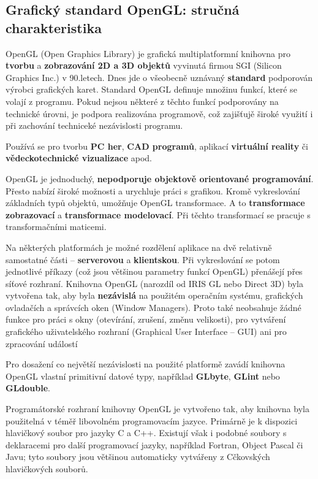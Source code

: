 \subsection{Grafický standard OpenGL: stručná charakteristika}
OpenGL (Open Graphics Library) je grafická multiplatformní knihovna pro \textbf{tvorbu} a \textbf{zobrazování 2D a 3D objektů} vyvinutá firmou SGI (Silicon Graphics Inc.) v 90.letech. Dnes jde o všeobecně uznávaný \textbf{standard} podporován výrobci grafických karet. Standard OpenGL definuje množinu funkcí, které se volají z programu. Pokud nejsou některé z těchto funkcí podporovány na technické úrovni, je podpora realizována programově, což zajišťujě široké využití i při zachování techniceké nezávislosti programu. 

Používá se pro tvorbu \textbf{PC her}, \textbf{CAD programů}, aplikací \textbf{virtuální reality} či \textbf{vědeckotechnické vizualizace} apod. 

OpenGL je jednoduchý, \textbf{nepodporuje objektově orientované programování}. Přesto nabízí široké možnosti a urychluje práci s grafikou. Kromě vykreslování základních typů objektů, umožňuje OpenGL transformace. A to \textbf{transformace zobrazovací} a \textbf{transformace modelovací}. Při těchto transformací se pracuje s transformačními maticemi.

Na některých platformách je možné rozdělení aplikace na dvě relativně samostatné části – \textbf{serverovou} a \textbf{klientskou}. Při vykreslování se potom jednotlivé příkazy (což jsou většinou parametry funkcí OpenGL) přenášejí přes síťové rozhraní. Knihovna OpenGL (narozdíl od IRIS GL nebo Direct 3D) byla vytvořena tak, aby byla \textbf{nezávislá} na použitém operačním systému, grafických ovladačích a správcích oken (Window Managers). Proto také neobsahuje žádné funkce pro práci s okny (otevírání, zrušení, změnu velikosti), pro vytváření grafického uživatelského rozhraní (Graphical User Interface – GUI) ani pro zpracování událostí

Pro dosažení co největší nezávislosti na použité platformě zavádí knihovna OpenGL vlastní primitivní datové typy, například \textbf{GLbyte}, \textbf{GLint} nebo \textbf{GLdouble}.

Programátorské rozhraní knihovny OpenGL je vytvořeno tak, aby knihovna byla použitelná v téměř libovolném programovacím jazyce. Primárně je k dispozici hlavičkový soubor pro jazyky C a C++. Existují však i podobné soubory s deklaracemi pro další programovací jazyky, například Fortran, Object Pascal či Javu; tyto soubory jsou většinou automaticky vytvářeny z Cčkovských hlavičkových souborů.

